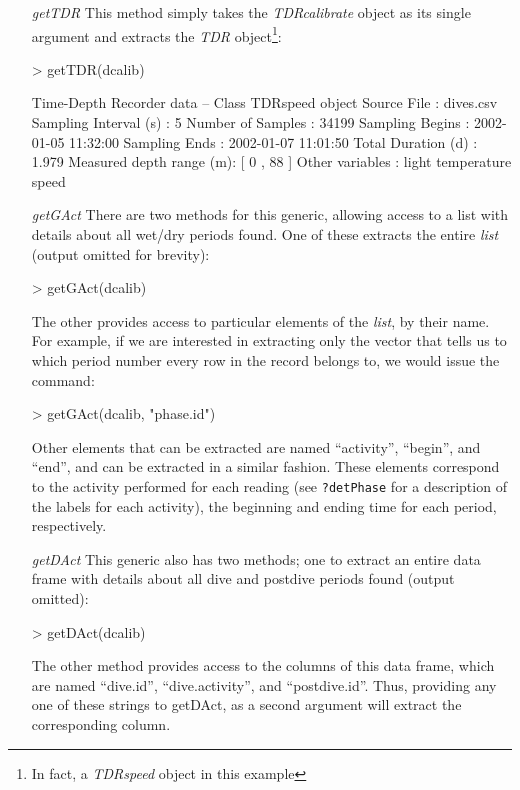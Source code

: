 \documentclass[12pt, letterpaper]{scrartcl}
\newcommand{\Rclass}[1]{{\textit{#1}}}
\newcommand{\Rmethod}[1]{{\textit{#1}}}
\begin{document}
\begin{itemize}
\item [\Rmethod{getTDR}] This method simply takes the
  \Rclass{TDRcalibrate} object as its single argument and extracts the
  \Rclass{TDR} object\footnote{In fact, a \Rclass{TDRspeed} object in this
    example}:
\begin{Schunk}
\begin{Sinput}
> getTDR(dcalib)
\end{Sinput}
\begin{Soutput}
Time-Depth Recorder data -- Class TDRspeed object
  Source File             : dives.csv 
  Sampling Interval (s)   : 5 
  Number of Samples       : 34199 
  Sampling Begins         : 2002-01-05 11:32:00 
  Sampling Ends           : 2002-01-07 11:01:50 
  Total Duration (d)      : 1.979 
  Measured depth range (m): [ 0 , 88 ]
  Other variables         : light temperature speed 
\end{Soutput}
\end{Schunk}

\item [\Rmethod{getGAct}] There are two methods for this generic, allowing
  access to a list with details about all wet/dry periods found.  One of
  these extracts the entire \Rclass{list} (output omitted for brevity):
\begin{Schunk}
\begin{Sinput}
> getGAct(dcalib)
\end{Sinput}
\end{Schunk}
The other provides access to particular elements of the \Rclass{list}, by
their name.  For example, if we are interested in extracting only the
vector that tells us to which period number every row in the record
belongs to, we would issue the command:
\begin{Schunk}
\begin{Sinput}
> getGAct(dcalib, "phase.id")
\end{Sinput}
\end{Schunk}
Other elements that can be extracted are named ``activity'', ``begin'',
and ``end'', and can be extracted in a similar fashion.  These elements
correspond to the activity performed for each reading (see
\verb|?detPhase| for a description of the labels for each activity), the
beginning and ending time for each period, respectively.

\item [\Rmethod{getDAct}] This generic also has two methods; one to
  extract an entire data frame with details about all dive and postdive
  periods found (output omitted):
\begin{Schunk}
\begin{Sinput}
> getDAct(dcalib)
\end{Sinput}
\end{Schunk}
The other method provides access to the columns of this data frame, which
are named ``dive.id'', ``dive.activity'', and ``postdive.id''.  Thus,
providing any one of these strings to getDAct, as a second argument will
extract the corresponding column.


\end{itemize}
\end{document}
